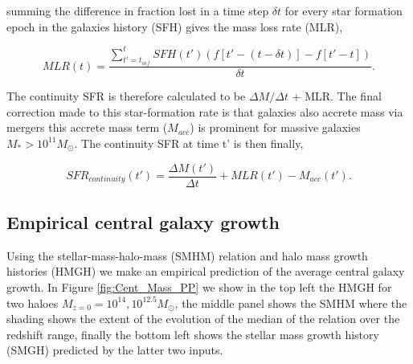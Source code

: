 summing the difference in fraction lost in a time step $\delta t$ for every star formation epoch in the galaxies history (SFH) gives the mass loss rate (MLR), 

\begin{equation}
\label{eqn:MLR}
MLR(t) = \frac{ \sum_{t' = t_{inf}}^{t} SFH(t')(f[t' - (t-\delta t)]-f[t' - t]) }{\delta t} .
\end{equation}

The continuity SFR is therefore calculated to be $\Delta M / \Delta t$ + MLR. The final correction made to this star-formation rate is that galaxies also accrete mass via mergers this accrete mass term ($M_{acc}$) is prominent for massive galaxies $M_* > 10^{11} M_{\odot}$. The continuity SFR at time t' is then finally,

\begin{equation}
    SFR_{continuity}(t') = \frac{\Delta M(t')}{\Delta t} + MLR(t') - M_{acc}(t').
\end{equation}

\subsection{Empirical central galaxy growth}

Using the stellar-mass-halo-mass (SMHM) relation and halo mass growth histories (HMGH) we make an empirical prediction of the average central galaxy growth. In Figure \ref{fig:Cent_Mass_PP} we show in the top left the HMGH for two haloes $M_{z=0} = 10^{14}, 10^{12.5} M_{\odot}$, the middle panel shows the SMHM where the shading shows the extent of the evolution of the median of the relation over the redshift range, finally the bottom left shows the stellar mass growth history (SMGH) predicted by the latter two inputs.

